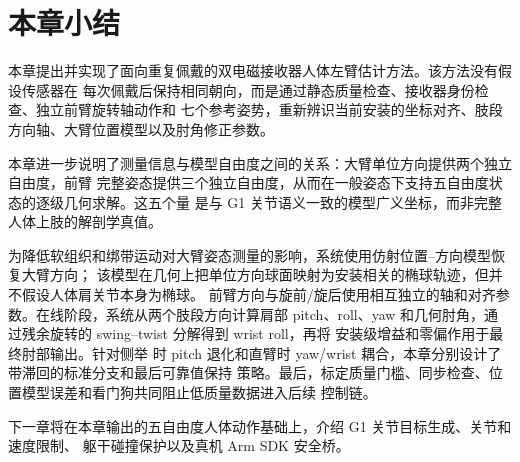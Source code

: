 \section{本章小结}
\label{sec:ch4_summary}

本章提出并实现了面向重复佩戴的双电磁接收器人体左臂估计方法。该方法没有假设传感器在
每次佩戴后保持相同朝向，而是通过静态质量检查、接收器身份检查、独立前臂旋转轴动作和
七个参考姿势，重新辨识当前安装的坐标对齐、肢段方向轴、大臂位置模型以及肘角修正参数。

本章进一步说明了测量信息与模型自由度之间的关系：大臂单位方向提供两个独立自由度，前臂
完整姿态提供三个独立自由度，从而在一般姿态下支持五自由度状态的逐级几何求解。这五个量
是与 G1 关节语义一致的模型广义坐标，而非完整人体上肢的解剖学真值。

为降低软组织和绑带运动对大臂姿态测量的影响，系统使用仿射位置--方向模型恢复大臂方向；
该模型在几何上把单位方向球面映射为安装相关的椭球轨迹，但并不假设人体肩关节本身为椭球。
前臂方向与旋前/旋后使用相互独立的轴和对齐参数。在线阶段，系统从两个肢段方向计算肩部
pitch、roll、yaw 和几何肘角，通过残余旋转的 swing--twist 分解得到 wrist roll，再将
安装级增益和零偏作用于最终肘部输出。针对侧举
时 pitch 退化和直臂时 yaw/wrist 耦合，本章分别设计了带滞回的标准分支和最后可靠值保持
策略。最后，标定质量门槛、同步检查、位置模型误差和看门狗共同阻止低质量数据进入后续
控制链。

下一章将在本章输出的五自由度人体动作基础上，介绍 G1 关节目标生成、关节和速度限制、
躯干碰撞保护以及真机 Arm SDK 安全桥。

